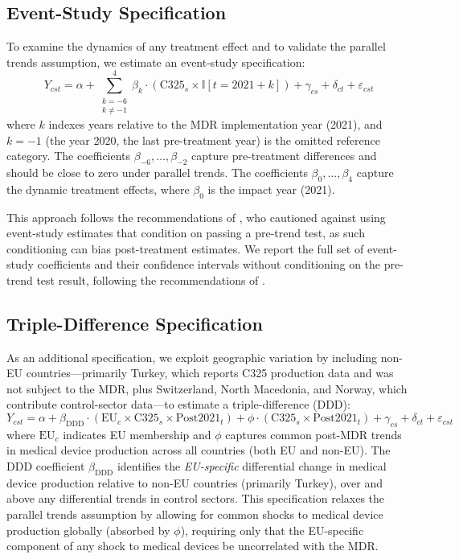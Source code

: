 \documentclass[12pt]{article}
\newcommand{\ind}{\mathbb{I}}
\begin{document}
\subsection{Event-Study Specification}

To examine the dynamics of any treatment effect and to validate the parallel trends assumption, we estimate an event-study specification:
\begin{equation}
\label{eq:eventstudy}
Y_{cst} = \alpha + \sum_{\substack{k = -6 \\ k \neq -1}}^{4} \beta_k \cdot (\text{C325}_s \times \ind[t = 2021 + k]) + \gamma_{cs} + \delta_{ct} + \varepsilon_{cst}
\end{equation}
where $k$ indexes years relative to the MDR implementation year (2021), and $k = -1$ (the year 2020, the last pre-treatment year) is the omitted reference category. The coefficients $\beta_{-6}, \ldots, \beta_{-2}$ capture pre-treatment differences and should be close to zero under parallel trends. The coefficients $\beta_0, \ldots, \beta_4$ capture the dynamic treatment effects, where $\beta_0$ is the impact year (2021).

This approach follows the recommendations of \citet{roth2023pretest}, who cautioned against using event-study estimates that condition on passing a pre-trend test, as such conditioning can bias post-treatment estimates. We report the full set of event-study coefficients and their confidence intervals without conditioning on the pre-trend test result, following the recommendations of \citet{rambachan2023more}.

\subsection{Triple-Difference Specification}

As an additional specification, we exploit geographic variation by including non-EU countries---primarily Turkey, which reports C325 production data and was not subject to the MDR, plus Switzerland, North Macedonia, and Norway, which contribute control-sector data---to estimate a triple-difference (DDD):
\begin{equation}
\label{eq:ddd}
Y_{cst} = \alpha + \beta_{\text{DDD}} \cdot (\text{EU}_c \times \text{C325}_s \times \text{Post2021}_t) + \phi \cdot (\text{C325}_s \times \text{Post2021}_t) + \gamma_{cs} + \delta_{ct} + \varepsilon_{cst}
\end{equation}
where $\text{EU}_c$ indicates EU membership and $\phi$ captures common post-MDR trends in medical device production across all countries (both EU and non-EU). The DDD coefficient $\beta_{\text{DDD}}$ identifies the \textit{EU-specific} differential change in medical device production relative to non-EU countries (primarily Turkey), over and above any differential trends in control sectors. This specification relaxes the parallel trends assumption by allowing for common shocks to medical device production globally (absorbed by $\phi$), requiring only that the EU-specific component of any shock to medical devices be uncorrelated with the MDR.
\end{document}
